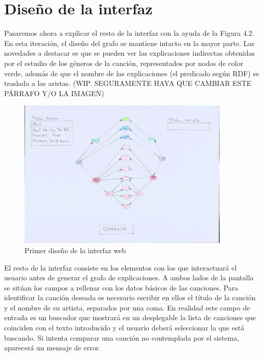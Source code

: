 \section{Diseño de la interfaz}

Pasaremos ahora a explicar el resto de la interfaz con la ayuda de la Figura 4.2. En esta iteración, el diseño del grafo se mantiene intacto en la mayor parte. Las novedades a destacar es que se pueden ver las explicaciones indirectas obtenidas por el estudio de los géneros de la canción, representados por nodos de color verde, además de que el nombre de las explicaciones (el predicado según RDF) se traslada a las aristas. (WIP. SEGURAMENTE HAYA QUE CAMBIAR ESTE PÁRRAFO Y/O LA IMAGEN)\\

\begin{figure}[h!]
	\centering
	\includegraphics[width = 0.9\textwidth]{Imagenes/Bitmap/Segunda Interfaz.jpg}
	\caption{Primer diseño de la interfaz web}
	\label{fig:sampleImage}
\end{figure}

El resto de la interfaz consiste en los elementos con los que interactuará el usuario antes de generar el grafo de explicaciones. A ambos lados de la pantalla se sitúan los campos a rellenar con los datos básicos de las canciones. Para identificar la canción deseada es necesario escribir en ellos el título de la canción y el nombre de su artista, separados por una coma. En realidad este campo de entrada es un buscador que mostrará en un desplegable la lista de canciones que coinciden con el texto introducido y el usuario deberá seleccionar la que está buscando. Si intenta comparar una canción no contemplada por el sistema, aparecerá un mensaje de error.\\

